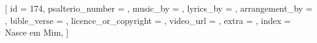 [
    id                     = {174},
    psalterio_number       = {},
    music_by               = {},
    lyrics_by              = {},
    arrangement_by         = {},
    bible_verse            = {},
    licence_or_copyright   = {},
    video_url              = {},
    extra                  = {},
    index                  = {Nasce em Mim},
]


\beginverse


\endverse


\beginchorus


\endchorus


\beginverse


\endverse



\endsong
